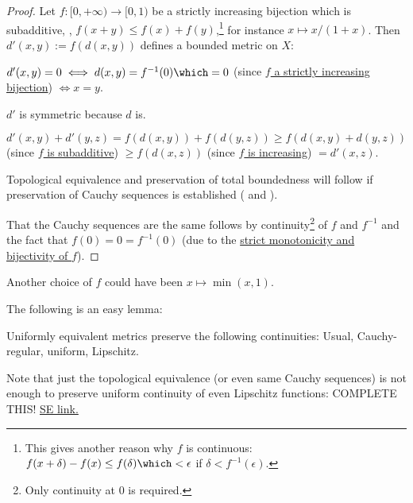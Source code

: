 	\begin{proof}
		Let $f\colon[0, +\infty)\to [0, 1)$ be a strictly increasing bijection which is subadditive, \ie, $f(x + y)\le f(x) + f(y)$,\footnote{
			This gives another reason why $f$ is continuous: $f(x + \delta) - f(x)\le f(\delta) \which < \epsilon$ if $\delta < f^{-1}(\epsilon)$.
		} for instance $x\mapsto x/(1 + x)$. Then $d'(x, y) := f(d(x, y))$ defines a bounded metric on $X$:
		\begin{prooflist}
			\item $d'(x, y) = 0\iff d(x, y) = f^{-1}(0)\which = 0$ (since \uline{$f$ a strictly increasing bijection}) $\iff x = y$.
			
			\item $d'$ is symmetric because $d$ is.
			
			\item $d'(x, y) + d'(y, z) = f(d(x, y)) + f(d(y, z))\ge f(d(x, y) + d(y, z))$ (since \uline{$f$ is subadditive}) $\ge f(d(x, z))$ (since \uline{$f$ is increasing}) $ = d'(x, z)$.
		\end{prooflist}
		
		Topological equivalence and preservation of total boundedness will follow if preservation of Cauchy sequences is established ( and \resp {}).
		
		That the Cauchy sequences are the same follows by continuity\footnote{
			Only continuity at $0$ is required.
		} of $f$ and $f^{-1}$ and the fact that $f(0) = 0 = f^{-1}(0)$ (due to the \uline{strict monotonicity and bijectivity of $f$}).
	\end{proof}
	
	\begin{rmk}
		Another choice of $f$ could have been $x\mapsto \min(x, 1)$.
	\end{rmk}
	
	
	The following is an easy lemma:
	
	\begin{lem}
		Uniformly equivalent metrics preserve the following continuities: Usual, Cauchy-regular, uniform, Lipschitz.
	\end{lem}
	
	\begin{rmk}
		Note that just the topological equivalence (or even same Cauchy sequences) is not enough to preserve uniform continuity of even Lipschitz functions: COMPLETE THIS! \href{https://math.stackexchange.com/questions/1963784/uniform-continuity-preserved-with-equivalent-metrics}{SE link.}
	\end{rmk}
	



